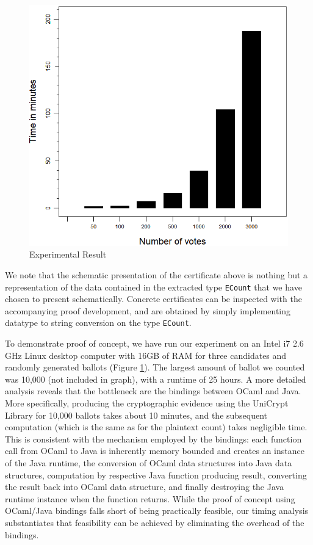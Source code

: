 \begin{figure}
\centering
\includegraphics[scale=0.80]{PlotVer3.png}
\caption{Experimental Result}
  \label{fig:experimental_result}
\end{figure}
 We note that the schematic presentation of the certificate above is
 nothing but a representation of the data contained in the extracted
 type \texttt{ECount} that we have chosen to present schematically.
 Concrete certificates can be inspected with the accompanying proof
 development, and are obtained by simply implementing datatype to
 string conversion on the type \texttt{ECount}.
 



To demonstrate proof of concept, 
we have run our experiment on an  Intel  i7  2.6  GHz  Linux  desktop  computer
with  16GB  of  RAM for three candidates and randomly generated ballots (Figure \ref{fig:experimental_result}). 
The largest  amount of ballot we counted was 10,000 (not included in
graph), with a runtime of 25 hours. A more detailed analysis reveals
that the bottleneck are the bindings between OCaml and Java. More
specifically, producing the cryptographic evidence using the
UniCrypt Library for 10,000 ballots takes about 10 minutes, and the
subsequent computation (which is the same as for the plaintext
count) takes negligible time. This is consistent with the mechanism
employed by the bindings:
each function call from OCaml to Java is inherently memory bounded
and creates an instance of the Java runtime, 
the conversion of OCaml data structures into Java data
structures, 
computation by respective Java function producing result,
converting the result back into OCaml data structure, and finally destroying 
the Java runtime instance when the function returns. While the proof
of concept using OCaml/Java bindings falls short of being
practically feasible, our timing analysis substantiates that
feasibility can be achieved by eliminating the overhead of the
bindings. 


